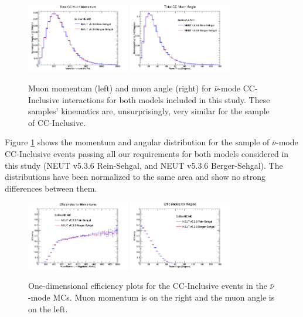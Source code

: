 \documentclass[11pt]{article}
\begin{document}
\begin{figure}[H]
\centering
\includegraphics[width=0.4\textwidth]{CCInclusivePlots/ANMCCInclusiveTotalMomentum.png}
\includegraphics[width=0.4\textwidth]{CCInclusivePlots/ANMCCInclusiveTotalAngle.png}
\caption{Muon momentum (left) and muon angle (right) for $\bar{\nu}$-mode CC-Inclusive interactions for both models included in this study. These samples' kinematics are, unsurprisingly, very similar for the sample of CC-Inclusive.}
\label{fig:AntiNuCCInclusiveMomAndAngle}
\end{figure}

Figure \ref*{fig:AntiNuCCInclusiveMomAndAngle} shows the momentum and angular distribution for the sample of $\bar{\nu}$-mode CC-Inclusive events passing all our requirements for both models considered in this study (NEUT v5.3.6 Rein-Sehgal, and NEUT v5.3.6 Berger-Sehgal). The distributions have been normalized to the same area and show no strong differences between them.

\begin{figure}[H]
\centering
\includegraphics[width=0.4\textwidth]{ANMCombinedPlotsImages/16-ANMCombinedPlots.png}
\includegraphics[width=0.4\textwidth]{ANMCombinedPlotsImages/15-ANMCombinedPlots.png}
\caption{One-dimensional efficiency plots for the CC-Inclusive events in the $\bar{\nu}$-mode MCs. Muon momentum is on the right and the muon angle is on the left.}
\label{fig:OneDEfficiencyAntiNu}
\end{figure}
\end{document}
